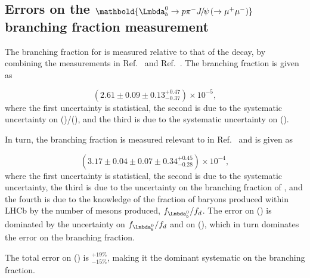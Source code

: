 
\subsection[Errors on the $\Lb\to\proton\pim\jpsi(\to\mumu)$ branching fraction measurement]{Errors on the $\mathbold{\Lb\to\proton\pim\jpsi(\to\mumu)}$ branching fraction measurement}
The branching fraction for \Lbpijpsi is measured relative to that of the \LbKjpsi decay, by combining the measurements in Ref.~\cite{LbKjpsi} and Ref.~\cite{LHCb-PAPER-2014-020}. The \Lbpijpsi branching fraction is given as

\begin{equation}
  (2.61 \pm 0.09 \pm 0.13^{+0.47}_{-0.37})\times 10^{-5},
\end{equation}
where the first uncertainty is statistical, the second is due to the systematic uncertainty on \BF(\Lbpijpsi)/\BF(\LbKjpsi), and the third is due to the systematic uncertainty on \BF(\LbKjpsi). %

In turn, the \LbKjpsi branching fraction is measured relevant to \BdToJPsiKst in Ref.~\cite{LbKjpsi} and is given as

\begin{equation}
  (3.17 \pm 0.04\pm0.07\pm0.34^{+0.45}_{-0.28})\times 10^{-4},
\end{equation}
where the first uncertainty is statistical, the second is due to the systematic uncertainty, the third is due to the uncertainty on the branching fraction of \BdToJPsiKst, and the fourth is due to the knowledge of the fraction of \Lb baryons produced within LHCb by the number of \Bd mesons produced, $f_{\Lb}/f_{d}$. The error on \BF(\LbKjpsi) is dominated by the uncertainty on $f_{\Lb}/f_{d}$ and on \BF(\BdToJPsiKst), which in turn dominates the error on the \Lbpijpsi branching fraction.

The total error on \BF(\Lbpijpsi) is $^{+19\%}_{-15\%}$, making it the dominant systematic on the \Lbpi branching fraction. %

